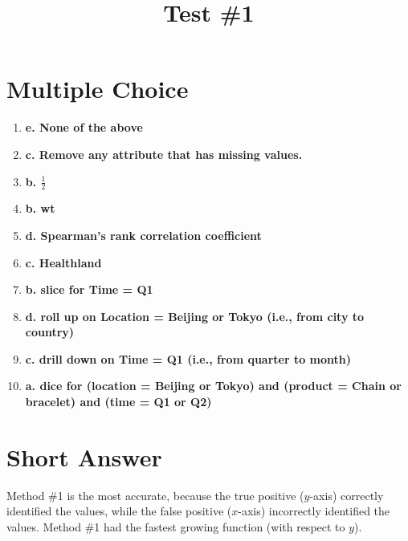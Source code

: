 \documentclass[12pt]{scrartcl}
\title{Test \#1}
\begin{document}
\maketitle

\section*{Multiple Choice}
\begin{enumerate}
    \item \textbf{e. None of the above}
    \item \textbf{c. Remove any attribute that has missing values.}
    \item \textbf{b. $\frac{1}{2}$}
    \item \textbf{b. wt}
    \item \textbf{d. Spearman’s rank correlation coefficient}
    \item \textbf{c. Healthland}
    \item \textbf{b. slice for Time = Q1}
    \item \textbf{d. roll up on Location = Beijing or Tokyo  (i.e., from city to country)}
    \item \textbf{c. drill down on Time = Q1  (i.e., from quarter to month)}
    \item \textbf{a. dice for (location = Beijing or Tokyo) and (product = Chain or bracelet) and (time = Q1 or Q2)}
\end{enumerate}

\setcounter{section}{10}
\section{Short Answer}
Method \#1 is the most accurate, because the true positive ($y$-axis) correctly identified the values, while the false positive ($x$-axis) incorrectly identified the values. Method \#1 had the fastest growing function (with respect to $y$).
\end{document}

